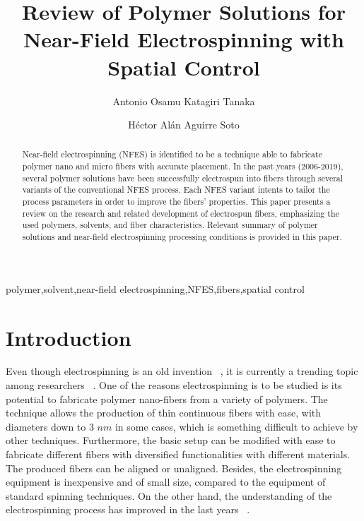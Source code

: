 \documentclass[5p,,preprint,12pt,twocolumn]{elsarticle}
\begin{document}
\begin{frontmatter}
	
\title{Review of Polymer Solutions for Near-Field Electrospinning with Spatial Control
}
    
\author[]{Antonio Osamu Katagiri Tanaka}
\author[]{H{\'e}ctor Al\'{a}n Aguirre Soto}
    

\begin{abstract}
Near-field electrospinning (NFES) is identified to be a technique able to fabricate polymer nano and micro fibers with accurate placement. In the past years (2006-2019), several polymer solutions have been successfully electrospun into fibers through several variants of the conventional NFES process. Each NFES variant intents to tailor the process parameters in order to improve the fibers' properties. This paper presents a review on the research and related development of electrospun fibers, emphasizing the used polymers, solvents, and fiber characteristics. Relevant summary of polymer solutions and near-field electrospinning processing conditions is provided in this paper.
\end{abstract}
\begin{keyword} 
      polymer\sep solvent\sep near-field electrospinning\sep NFES\sep fibers\sep spatial control
\end{keyword}
      
\end{frontmatter}
\tableofcontents

    
\section{Introduction}
Even though electrospinning is an old invention \unskip~\cite{527120:12073288}, it is currently a trending topic among researchers \unskip~\cite{527120:12073453,527120:12073495,527120:12073496}. One of the reasons electrospinning is to be studied is its potential to fabricate polymer nano-fibers from a variety of polymers. The technique allows the production of thin continuous fibers with ease, with diameters down to 3 $nm $ in some cases, which is something difficult to achieve by other techniques. Furthermore, the basic setup can be modified with ease to fabricate different fibers with diversified functionalities with different materials. The produced fibers can be aligned or unaligned. Besides, the electrospinning equipment is inexpensive and of small size, compared to the equipment of standard spinning techniques. On the other hand, the understanding of the electrospinning process has improved in the last years \unskip~\cite{527120:12073538}.
\end{document}
